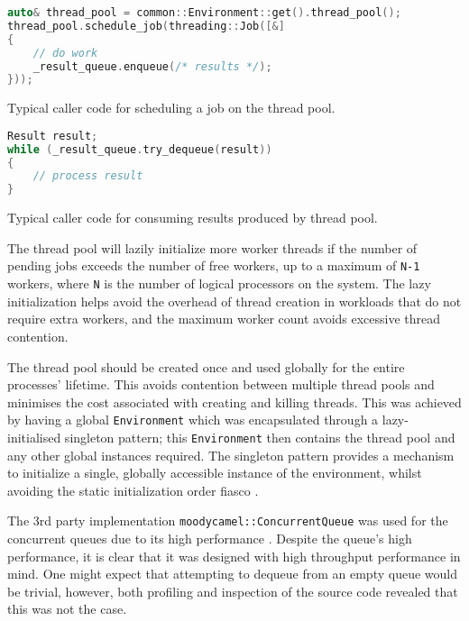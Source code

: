 \begin{lstfloat}[H]
    \begin{lstlisting}[language=c++]
auto& thread_pool = common::Environment::get().thread_pool();
thread_pool.schedule_job(threading::Job([&]
{
    // do work
    _result_queue.enqueue(/* results */);
}));
    \end{lstlisting}
    \caption{Typical caller code for scheduling a job on the thread pool.}
    \label{code:schedule-job}
\end{lstfloat}

\begin{lstfloat}[H]
    \begin{lstlisting}[language=c++]
Result result;
while (_result_queue.try_dequeue(result))
{
    // process result
}
    \end{lstlisting}
    \caption{Typical caller code for consuming results produced by thread pool.}
    \label{code:consume-results}
\end{lstfloat}

The thread pool will lazily initialize more worker threads if the number of pending jobs exceeds the number of free workers, up to a maximum of \texttt{N-1} workers, where \texttt{N} is the number of logical processors on the system. The lazy initialization helps avoid the overhead of thread creation in workloads that do not require extra workers, and the maximum worker count avoids excessive thread contention.

The thread pool should be created once and used globally for the entire processes' lifetime. This avoids contention between multiple thread pools and minimises the cost associated with creating and killing threads. This was achieved by having a global \texttt{Environment} which was encapsulated through a lazy-initialised singleton pattern; this \texttt{Environment} then contains the thread pool and any other global instances required. The singleton pattern provides a mechanism to initialize a single, globally accessible instance of the environment, whilst avoiding the static initialization order fiasco \cite{cpp-siof}.

The 3rd party implementation \texttt{moodycamel::ConcurrentQueue} \cite{moodycamel} was used for the concurrent queues due to its high performance \cite{moodycamel-benchmark}. Despite the queue's high performance, it is clear that it was designed with high throughput performance in mind. One might expect that attempting to dequeue from an empty queue would be trivial, however, both profiling and inspection of the source code revealed that this was not the case.

